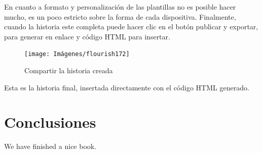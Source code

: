 \documentclass[
]{book}
\begin{document}
En cuanto a formato y personalización de las plantillas no es posible hacer mucho, es un poco estricto sobre la forma de cada dispositiva. Finalmente, cuando la historia este completa puede hacer clic en el botón publicar y exportar, para generar en enlace y código HTML para insertar.

\begin{figure}

{\centering \texttt{[image: Imágenes/flourish172]} 

}

\caption{Compartir la historia creada}\label{fig:compartirhistoriaflourish-fig}
\end{figure}

Esta es la historia final, insertada directamente con el código HTML generado.

\hypertarget{conclu}{%
\chapter{Conclusiones}\label{conclu}}

We have finished a nice book.

  
\end{document}
